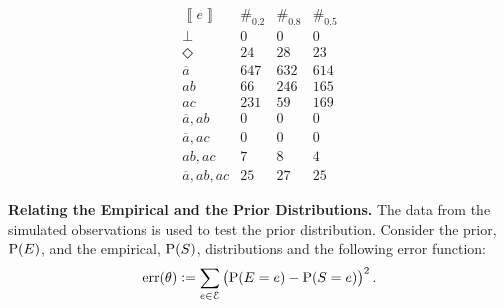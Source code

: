 \documentclass{article}
\newcommand{\at}[1]{\ensuremath{\!\del{#1}}}
\newcommand{\co}[1]{\ensuremath{\overline{#1}}}
\newcommand{\cla}[1]{\ensuremath{{\cal #1}}}
\newcommand{\stablecore}[1]{\ensuremath{\left\llbracket #1 \right\rrbracket}}
\newcommand{\prfunc}{\ensuremath{\mathrm{P}}}
\newcommand{\pr}[1]{\ensuremath{\prfunc\at{#1}}}
\newcommand{\err}[1]{\ensuremath{\mathrm{err}\at{#1}}}
\newcommand{\class}[1]{\ensuremath{[{#1}]_{\sim}}}
\newcommand{\inconsistent}{\bot}
\newcommand{\indepclass}{\ensuremath{\Diamond}}
\newcommand{\EVENTSset}{\ensuremath{\cla{E}}}
\begin{document}
\begin{table}[t]
	\begin{center}
		$$
			\begin{array}{l|ccc}
				\stablecore{e}
				 & \#_{0.2}
				 & \#_{0.8}
				 & \#_{0.5}
				\\
				\hline
				\inconsistent
				 & 0
				 & 0
				 & 0
				\\[2pt]
				\indepclass
				 & 24
				 & 28
				 & 23
				\\[2pt]
				\co{a}
				 & 647
				 & 632
				 & 614
				\\[2pt]
				ab
				 & 66
				 & 246
				 & 165
				\\[2pt]
				ac
				 & 231
				 & 59
				 & 169
				\\[2pt]
				\co{a}, ab
				 & 0
				 & 0
				 & 0
				\\[2pt]
				\co{a}, ac
				 & 0
				 & 0
				 & 0
				\\[2pt]
				ab, ac
				 & 7
				 & 8
				 & 4
				\\[2pt]
				\co{a}, ab, ac
				 & 25
				 & 27
				 & 25
			\end{array}
		$$
	\end{center}

	\caption{\emph{Experiments 2 and 3.} Results from experiments,
	  each with $n=1000$ samples generated following the
	  \emph{Model+Noise} procedure, with parameters
	  $\alpha = 0.1, \beta = 0.3, \gamma = 0.8$ (Experiment 2: bias to
	  $ab$.) and $\gamma=0.5$ (Experiment 3: balanced $ab$ and $ac$.).
	  Empirical distributions are represented by the random variables
	  $S_{0.8}$ and $S_{0.5}$ respectively.  Data from experience
	  \cref{tab:sbf.example} is also included, and denoted by
	  $S_{0.2}$, to provide reference.  Columns $\#_{0.2}$, $\#_{0.8}$
	  and $\#_{0.5}$ contain $\#\set{S_{0.2} \in \class{e}}$,
	  $\#\set{S_{0.8} \in \class{e}}$ and
	  $\#\set{S_{0.5} \in \class{e}}$, the respective number of events
	  in each class.}\label{tab:sbf.examples.2.3}
\end{table}

\noindent\textbf{Relating the Empirical and the Prior Distributions.}
The data from the simulated observations is used to test the prior
distribution.  Consider the prior, $\pr{E}$, and the empirical,
$\pr{S}$, distributions and the following error function:
\begin{equation}
	\err{\theta} := \sum_{e\in\EVENTSset} \del{\pr{E = e} - \pr{S = e}}^2.\label{eq:err.e.s}
\end{equation}
\end{document}
